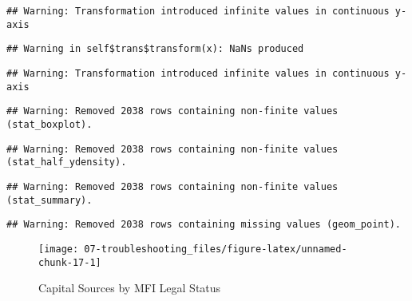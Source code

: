 \documentclass[a4paper,nobind]{templates/ociamthesis}
\begin{document}
\begin{landscape}
\begin{verbatim}
## Warning: Transformation introduced infinite values in continuous y-axis
\end{verbatim}

\begin{verbatim}
## Warning in self$trans$transform(x): NaNs produced
\end{verbatim}

\begin{verbatim}
## Warning: Transformation introduced infinite values in continuous y-axis
\end{verbatim}

\begin{verbatim}
## Warning: Removed 2038 rows containing non-finite values (stat_boxplot).
\end{verbatim}

\begin{verbatim}
## Warning: Removed 2038 rows containing non-finite values (stat_half_ydensity).
\end{verbatim}

\begin{verbatim}
## Warning: Removed 2038 rows containing non-finite values (stat_summary).
\end{verbatim}

\begin{verbatim}
## Warning: Removed 2038 rows containing missing values (geom_point).
\end{verbatim}

\begin{figure}

{\centering \texttt{[image: 07-troubleshooting\_files/figure-latex/unnamed-chunk-17-1]} 

}

\caption{Capital Sources by MFI Legal Status}\label{fig:unnamed-chunk-17}
\end{figure}

\end{landscape}
\end{document}
